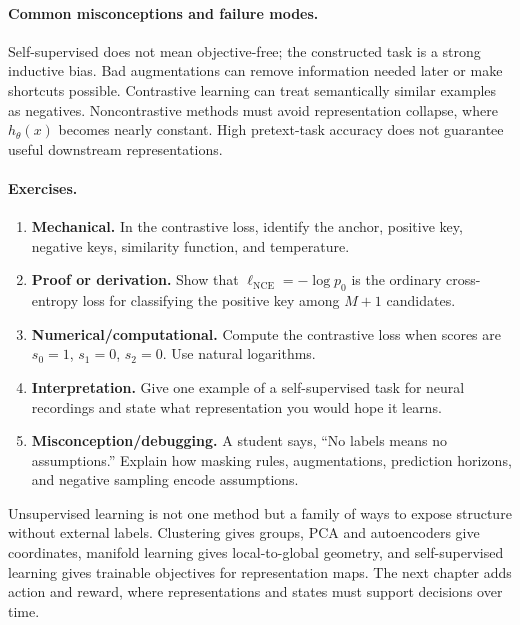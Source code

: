 \paragraph{Common misconceptions and failure modes.}
Self-supervised does not mean objective-free; the constructed task is a strong inductive bias. Bad augmentations can remove information needed later or make shortcuts possible. Contrastive learning can treat semantically similar examples as negatives. Noncontrastive methods must avoid representation collapse, where \(h_\theta(x)\) becomes nearly constant. High pretext-task accuracy does not guarantee useful downstream representations.

\paragraph{Exercises.}
\begin{enumerate}[label=\textbf{35.4.\arabic*.}, leftmargin=*]
\item \textbf{Mechanical.} In the contrastive loss, identify the anchor, positive key, negative keys, similarity function, and temperature.
\item \textbf{Proof or derivation.} Show that \(\ell_{\mathrm{NCE}}=-\log p_0\) is the ordinary cross-entropy loss for classifying the positive key among \(M+1\) candidates.
\item \textbf{Numerical/computational.} Compute the contrastive loss when scores are \(s_0=1\), \(s_1=0\), \(s_2=0\). Use natural logarithms.
\item \textbf{Interpretation.} Give one example of a self-supervised task for neural recordings and state what representation you would hope it learns.
\item \textbf{Misconception/debugging.} A student says, ``No labels means no assumptions.'' Explain how masking rules, augmentations, prediction horizons, and negative sampling encode assumptions.
\end{enumerate}

Unsupervised learning is not one method but a family of ways to expose structure without external labels. Clustering gives groups, PCA and autoencoders give coordinates, manifold learning gives local-to-global geometry, and self-supervised learning gives trainable objectives for representation maps. The next chapter adds action and reward, where representations and states must support decisions over time.

\clearpage
